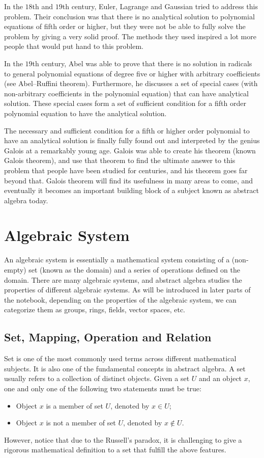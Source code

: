 In the $18$th and $19$th century, Euler, Lagrange and Gaussian tried to address this problem. Their conclusion was that there is no analytical solution to polynomial equations of fifth order or higher, but they were not be able to fully solve the problem by giving a very solid proof. The methods they used inspired a lot more people that would put hand to this problem.

In the $19$th century, Abel was able to prove that there is no solution in radicals to general polynomial equations of degree five or higher with arbitrary coefficients (see Abel–Ruffini theorem). Furthermore, he discusses a set of special cases (with non-arbitrary coefficients in the polynomial equation) that can have analytical solution. These special cases form a set of sufficient condition for a fifth order polynomial equation to have the analytical solution. 

The necessary and sufficient condition for a fifth or higher order polynomial to have an analytical solution is finally fully found out and interpreted by the genius Galois at a remarkably young age. Galois was able to create his theorem (known Galois theorem), and use that theorem to find the ultimate answer to this problem that people have been studied for centuries, and his theorem goes far beyond that. Galois theorem will find its usefulness in many areas to come, and eventually it becomes an important building block of a subject known as abstract algebra today. 

\section{Algebraic System}

An algebraic system is essentially a mathematical system consisting of a (non-empty) set (known as the domain) and a series of operations defined on the domain. There are many algebraic systems, and abstract algebra studies the properties of different algebraic systems. As will be introduced in later parts of the notebook, depending on the properties of the algebraic system, we can categorize them as groups, rings, fields, vector spaces, etc.

\subsection{Set, Mapping, Operation and Relation}

Set is one of the most commonly used terms across different mathematical subjects. It is also one of the fundamental concepts in abstract algebra. A set usually refers to a collection of distinct objects. Given a set $U$ and an object $x$, one and only one of the following two statements must be true:
\begin{itemize}
  \item Object $x$ is a member of set $U$, denoted by $x \in U$;
  \item Object $x$ is not a member of set $U$, denoted by $x \notin U$.
\end{itemize}
However, notice that due to the Russell's paradox, it is challenging to give a rigorous mathematical definition to a set that fulfill the above features.

